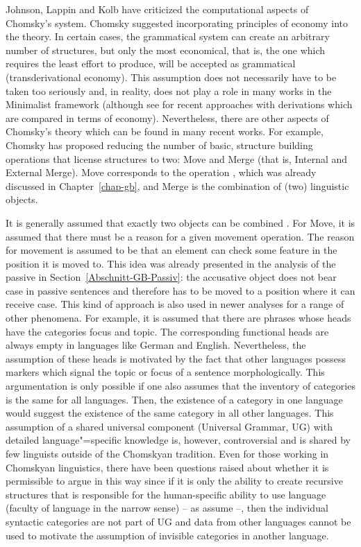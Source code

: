 Johnson, Lappin and Kolb have criticized the computational aspects of Chomsky's system. Chomsky suggested incorporating principles of economy into
the theory. In certain cases, the grammatical system can create an arbitrary number of structures, but only the most economical, that is, the one which
requires the least effort to produce, will be accepted as grammatical (transderivational economy). This assumption
does not necessarily have to be taken too seriously and, in reality, does not play a role in many works in the Minimalist framework (although see
\citet{Richards2015a} for recent approaches with derivations which are compared in terms of economy). Nevertheless, there are other aspects of 
Chomsky's theory which can be found in many recent works. For example, Chomsky has proposed reducing
the number of basic, structure building operations that license structures to two: Move and Merge (that is, Internal and External Merge).
Move corresponds to the operation \movea, which was already discussed in Chapter~\ref{chap-gb}, and
Merge is the combination of (two) linguistic objects.

It is generally assumed that exactly two objects can be combined \citep[]{Chomsky95a-u}.
For Move, it is assumed that there must be a reason for a given movement operation. The reason for
movement is assumed to be that an element can check some feature in the position it is moved to. This idea was already presented in the analysis of the passive in
Section~\ref{Abschnitt-GB-Passiv}: the accusative object does not bear case in passive sentences and therefore has to be moved to a position
where it can receive case. This kind of approach is also used in newer analyses for a range of other phenomena. For example, it is assumed that
there are phrases whose heads have the categories focus and topic. The
corresponding functional heads are always empty in languages like German and English.
Nevertheless, the assumption of these heads is motivated by the fact that other languages possess
markers which signal the topic or focus of a sentence morphologically. This argumentation is only
possible if one also assumes that the inventory of categories is the same for all languages. Then,
the existence of a category in one language would suggest the existence of the same category in all
other languages. This assumption of a shared universal component (Universal Grammar, UG)\indexug
with detailed language"=specific knowledge is, however, controversial and is shared by few linguists
outside of the Chomskyan tradition. Even for those working in Chomskyan linguistics, there have been
questions raised about whether it is permissible to argue in this way since if it is only the ability to create recursive structures that is responsible for the
human-specific ability to use language (faculty of language in the narrow sense) -- as \citet*{HCF2002a}
assume --, then the individual syntactic categories are not part of UG and data from other languages cannot be used
to motivate the assumption of invisible categories in another language.

